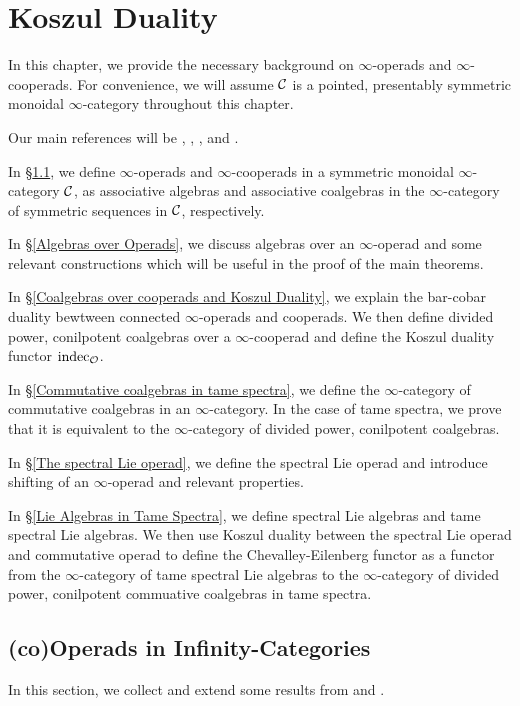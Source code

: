 \chapter{Koszul Duality}

In this chapter, we provide the necessary background on $\infty$-operads and $\infty$-cooperads. For convenience, we will assume ${\mathcal{C}}$ is a pointed, presentably symmetric monoidal $\infty$-category throughout this chapter.

Our main references will be \cite{BrantnerPhD},  \cite{Heuts_Koszul}, \cite{Francis-Gaitsgory}, \cite{Hadrianphdthesis} and \cite{HA}.
 
In \S \ref{(co)Operads in Infinity-Categories}, we define $\infty$-operads and $\infty$-cooperads in a symmetric monoidal $\infty$-category ${\mathcal{C}}$, as associative algebras and associative coalgebras in the $\infty$-category of symmetric sequences in ${\mathcal{C}}$, respectively.

In \S \ref{Algebras over Operads}, we discuss algebras over an $\infty$-operad and some relevant constructions which will be useful in the proof of the main theorems. 

In \S \ref{Coalgebras over cooperads and Koszul Duality}, we explain the bar-cobar duality bewtween connected $\infty$-operads and cooperads. We then define divided power, conilpotent coalgebras over a $\infty$-cooperad and define the Koszul duality functor $\operatorname{indec}_{{\mathcal{O}}}$.

In \S \ref{Commutative coalgebras in tame spectra}, we define the $\infty$-category of commutative coalgebras in an $\infty$-category. In the case of tame spectra, we prove that it is equivalent to the $\infty$-category of divided power, conilpotent coalgebras.

In \S \ref{The spectral Lie operad}, we define the spectral Lie operad and introduce shifting of an $\infty$-operad and relevant properties.

In \S \ref{Lie Algebras in Tame Spectra}, we define spectral Lie algebras and tame spectral Lie algebras. We then use Koszul duality between the spectral Lie operad and commutative operad to define the Chevalley-Eilenberg functor as a functor from the $\infty$-category of tame spectral Lie algebras to the $\infty$-category of divided power, conilpotent commuative coalgebras in tame spectra.




\section{(co)Operads in Infinity-Categories}
\label{(co)Operads in Infinity-Categories}
In this section, we collect and extend some results from \cite{BrantnerPhD} and \cite{Hadrianphdthesis}.

